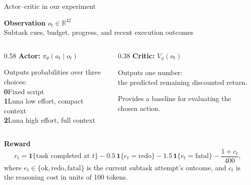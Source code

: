 \documentclass[aspectratio=169]{beamer}
\begin{document}

\begin{frame}{Actor--critic in our experiment}
  \begin{center}
    \textbf{Observation} $o_t\in\mathbb{R}^{42}$\\[3pt]
    Subtask cues, budget, progress, and recent execution outcomes
  \end{center}

  \medskip
  \begin{columns}[T,onlytextwidth]
    \begin{column}{0.58\textwidth}
      \textbf{Actor:} $\pi_\theta(a_t\mid o_t)$\par\smallskip
      Outputs probabilities over three choices:\\[4pt]
      \textbf{0}\quad Fixed script\\[3pt]
      \textbf{1}\quad Luna low effort, compact context\\[3pt]
      \textbf{2}\quad Luna high effort, full context
    \end{column}
    \begin{column}{0.38\textwidth}
      \textbf{Critic:} $V_\phi(o_t)$\par\smallskip
      Outputs one number:\\[4pt]
      the predicted remaining discounted return.\par\medskip
      Provides a baseline for evaluating the chosen action.
    \end{column}
  \end{columns}

  \bigskip
  \textbf{Reward}
\[
r_t =
\mathbf{1}\{\text{task completed at }t\}
- 0.5\,\mathbf{1}\{e_t=\text{redo}\}
- 1.5\,\mathbf{1}\{e_t=\text{fatal}\}
- \frac{1+c_t}{400},
\]
where $e_t\in\{\text{ok},\text{redo},\text{fatal}\}$ is the
current subtask attempt's outcome, and $c_t$ is the reasoning
cost in units of 100 tokens.


\end{frame}
\end{document}
